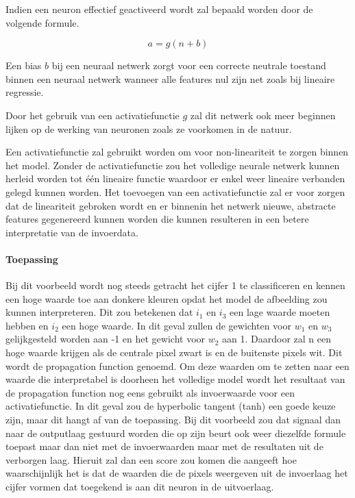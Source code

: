 Indien een neuron effectief geactiveerd wordt zal bepaald worden door de volgende formule.

\begin{equation}
a = g(n + b)
\end{equation}

Een bias $b$ bij een neuraal netwerk zorgt voor een correcte neutrale toestand binnen een neuraal netwerk wanneer alle features nul zijn net zoals bij lineaire regressie.  

Door het gebruik van een activatiefunctie $g$ zal dit netwerk ook meer beginnen lijken op de werking van neuronen zoals ze voorkomen in de natuur. 

Een activatiefunctie zal gebruikt worden om voor non-lineariteit te zorgen binnen het model. Zonder de activatiefunctie zou het volledige neurale netwerk kunnen herleid worden tot \'{e}\'{e}n lineaire functie waardoor er enkel weer lineaire verbanden gelegd kunnen worden. Het toevoegen van een activatiefunctie zal er voor zorgen dat de lineariteit gebroken wordt en er binnenin het netwerk nieuwe, abstracte features gegenereerd kunnen worden die kunnen resulteren in een betere interpretatie van de invoerdata.



\paragraph{Toepassing}
Bij dit voorbeeld wordt nog steeds getracht het cijfer 1 te classificeren en kennen een hoge waarde toe aan donkere kleuren opdat het model de afbeelding zou kunnen interpreteren. Dit zou betekenen dat $i_1$ en $i_3$ een lage waarde moeten hebben en $i_2$ een hoge waarde. In dit geval zullen de gewichten voor $w_1$ en $w_3$ gelijkgesteld worden aan -1 en het gewicht voor $w_2$ aan 1. Daardoor zal n een hoge waarde krijgen als de centrale pixel zwart is en de buitenste pixels wit. Dit wordt de propagation function genoemd. Om deze waarden om te zetten naar een waarde die interpretabel is doorheen het volledige model wordt het resultaat van de propagation function nog eens gebruikt als invoerwaarde voor een activatiefunctie. In dit geval zou de hyperbolic tangent (tanh) een goede keuze zijn, maar dit hangt af van de toepassing.
Bij dit voorbeeld zou dat signaal dan naar de outputlaag gestuurd worden die op zijn beurt ook weer diezelfde formule toepast maar dan niet met de invoerwaarden maar met de resultaten uit de verborgen laag. Hieruit zal dan een score zou komen die aangeeft hoe waarschijnlijk het is dat de waarden die de pixels weergeven uit de invoerlaag het cijfer vormen dat toegekend is aan dit neuron in de uitvoerlaag. 

